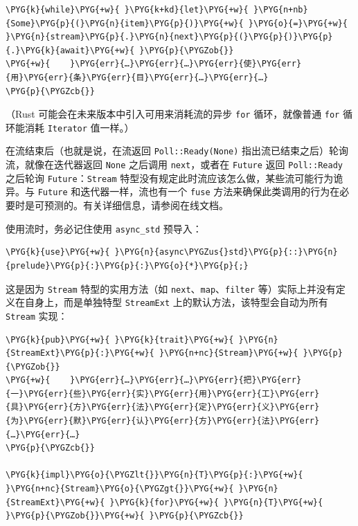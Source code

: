 \begin{Verbatim}[commandchars=\\\{\},breaklines=true,breakanywhere=true,fontsize=\codefont,xleftmargin=17bp]
\PYG{k}{while}\PYG{+w}{ }\PYG{k+kd}{let}\PYG{+w}{ }\PYG{n+nb}{Some}\PYG{p}{(}\PYG{n}{item}\PYG{p}{)}\PYG{+w}{ }\PYG{o}{=}\PYG{+w}{ }\PYG{n}{stream}\PYG{p}{.}\PYG{n}{next}\PYG{p}{(}\PYG{p}{)}\PYG{p}{.}\PYG{k}{await}\PYG{+w}{ }\PYG{p}{\PYGZob{}}
\PYG{+w}{    }\PYG{err}{…}\PYG{err}{…}\PYG{err}{使}\PYG{err}{用}\PYG{err}{条}\PYG{err}{目}\PYG{err}{…}\PYG{err}{…}
\PYG{p}{\PYGZcb{}}
\end{Verbatim}

（Rust 可能会在未来版本中引入可用来消耗流的异步 \texttt{for} 循环，就像普通 \texttt{for} 循环能消耗 \texttt{Iterator} 值一样。）

在流结束后（也就是说，在流返回 \texttt{Poll::Ready(None)} 指出流已结束之后）轮询流，就像在迭代器返回 \texttt{None} 之后调用 \texttt{next}，或者在 \texttt{Future} 返回 \texttt{Poll::Ready} 之后轮询 \texttt{Future}：\texttt{Stream} 特型没有规定此时流应该怎么做，某些流可能行为诡异。与 \texttt{Future} 和迭代器一样，流也有一个 \texttt{fuse} 方法来确保此类调用的行为在必要时是可预测的。有关详细信息，请参阅在线文档。

使用流时，务必记住使用 \texttt{async\_std} 预导入：

\begin{Verbatim}[commandchars=\\\{\},breaklines=true,breakanywhere=true,fontsize=\codefont,xleftmargin=17bp]
\PYG{k}{use}\PYG{+w}{ }\PYG{n}{async\PYGZus{}std}\PYG{p}{::}\PYG{n}{prelude}\PYG{p}{:}\PYG{p}{:}\PYG{o}{*}\PYG{p}{;}
\end{Verbatim}

这是因为 \texttt{Stream} 特型的实用方法（如 \texttt{next}、\texttt{map}、\texttt{filter} 等）实际上并没有定义在自身上，而是单独特型 \texttt{StreamExt} 上的默认方法，该特型会自动为所有 \texttt{Stream} 实现：

\begin{Verbatim}[commandchars=\\\{\},breaklines=true,breakanywhere=true,fontsize=\codefont,xleftmargin=17bp]
\PYG{k}{pub}\PYG{+w}{ }\PYG{k}{trait}\PYG{+w}{ }\PYG{n}{StreamExt}\PYG{p}{:}\PYG{+w}{ }\PYG{n+nc}{Stream}\PYG{+w}{ }\PYG{p}{\PYGZob{}}
\PYG{+w}{    }\PYG{err}{…}\PYG{err}{…}\PYG{err}{把}\PYG{err}{一}\PYG{err}{些}\PYG{err}{实}\PYG{err}{用}\PYG{err}{工}\PYG{err}{具}\PYG{err}{方}\PYG{err}{法}\PYG{err}{定}\PYG{err}{义}\PYG{err}{为}\PYG{err}{默}\PYG{err}{认}\PYG{err}{方}\PYG{err}{法}\PYG{err}{…}\PYG{err}{…}
\PYG{p}{\PYGZcb{}}

\PYG{k}{impl}\PYG{o}{\PYGZlt{}}\PYG{n}{T}\PYG{p}{:}\PYG{+w}{ }\PYG{n+nc}{Stream}\PYG{o}{\PYGZgt{}}\PYG{+w}{ }\PYG{n}{StreamExt}\PYG{+w}{ }\PYG{k}{for}\PYG{+w}{ }\PYG{n}{T}\PYG{+w}{ }\PYG{p}{\PYGZob{}}\PYG{+w}{ }\PYG{p}{\PYGZcb{}}
\end{Verbatim}

